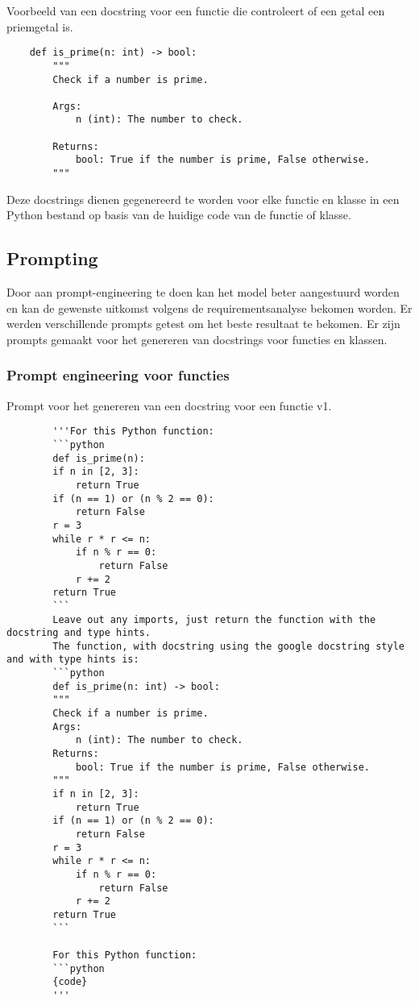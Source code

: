 \begin{listing}
    \caption[Docstring van een functie]{Voorbeeld van een docstring voor een functie die controleert of een getal een priemgetal is.}
    \label{lst:docstring-voorbeeld}
    \begin{verbatim}
    def is_prime(n: int) -> bool:
        """
        Check if a number is prime.

        Args:
            n (int): The number to check.

        Returns:
            bool: True if the number is prime, False otherwise.
        """
    \end{verbatim}
\end{listing}

Deze docstrings dienen gegenereerd te worden voor elke functie en klasse in een Python bestand op basis van de huidige code van de functie of klasse.

\subsection{Prompting}
\label{sec:bestanddocumentatie-prompting}

Door aan prompt-engineering te doen kan het model beter aangestuurd worden en kan de gewenste uitkomst volgens de requirementsanalyse bekomen worden.
Er werden verschillende prompts getest om het beste resultaat te bekomen.
Er zijn prompts gemaakt voor het genereren van docstrings voor functies en klassen. 

\subsubsection{Prompt engineering voor functies}

\begin{listing}
    \caption{Prompt voor het genereren van een docstring voor een functie v1.}
    \label{lst:prompt1}
    \begin{verbatim}
        '''For this Python function:
        ```python	
        def is_prime(n):
        if n in [2, 3]:
            return True
        if (n == 1) or (n % 2 == 0):
            return False
        r = 3
        while r * r <= n:
            if n % r == 0:
                return False
            r += 2
        return True
        ```
        Leave out any imports, just return the function with the docstring and type hints.
        The function, with docstring using the google docstring style and with type hints is:
        ```python	
        def is_prime(n: int) -> bool:
        """
        Check if a number is prime.
        Args:
            n (int): The number to check.
        Returns:
            bool: True if the number is prime, False otherwise.
        """
        if n in [2, 3]:
            return True
        if (n == 1) or (n % 2 == 0):
            return False
        r = 3
        while r * r <= n:
            if n % r == 0:
                return False
            r += 2
        return True
        ```
        
        For this Python function:
        ```python	
        {code}
        '''
    \end{verbatim}
\end{listing}

